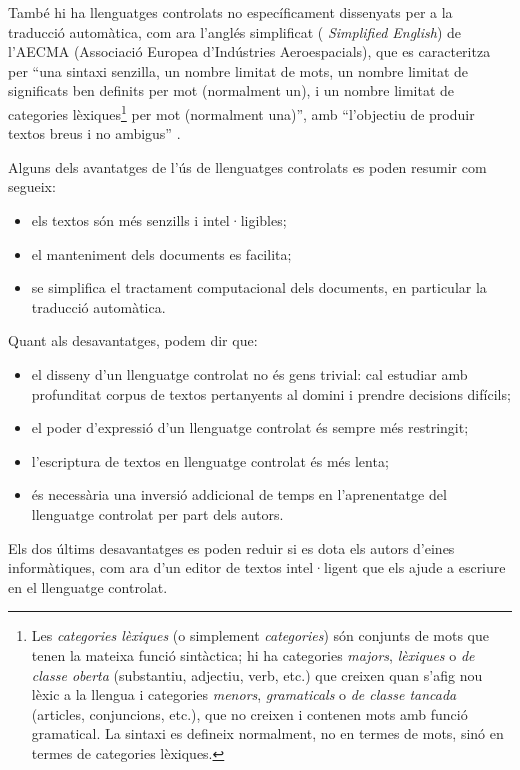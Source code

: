També hi ha llenguatges controlats no específicament dissenyats per a
la traducció automàtica, com ara l'anglés simplificat ({\em
  Simplified English}) de l'AECMA (Associació Europea d'Indústries
Aeroespacials), que es caracteritza per ``una sintaxi senzilla, un
nombre limitat de mots, un nombre limitat de significats ben definits
per mot (normalment un), i un nombre limitat de categories
lèxiques\footnote{Les \emph{categories lèxiques} (o simplement {\em
    categories}) són conjunts de mots que tenen la mateixa funció
  sintàctica; hi ha categories \emph{majors}, \emph{lèxiques} o
  \emph{de classe oberta} (substantiu, adjectiu, verb, etc.) que
  creixen quan s'afig nou lèxic a la llengua i categories
  \emph{menors}, {\em gramaticals} o \emph{de classe tancada}
  (articles, conjuncions, etc.), que no creixen i contenen mots amb
  funció gramatical. La sintaxi es defineix normalment, no en termes
  de mots, sinó en termes de categories lèxiques.}\label{pg:catgra}
per mot (normalment una)'', amb ``l'objectiu de produir textos breus i
no ambigus'' \citep{AECMA07u}.


Alguns dels avantatges de l'ús de llenguatges controlats \citep{schwitten07u} es poden
resumir com segueix:
\begin{itemize}
\item els textos són més senzills i intel·ligibles;
\item el manteniment dels documents es facilita;
\item se simplifica el tractament computacional dels documents,  en
particular la traducció automàtica.
\end{itemize} 
Quant als desavantatges, podem dir que:
\begin{itemize}
\item 
    el disseny d'un llenguatge controlat no és gens trivial: cal
    estudiar amb profunditat corpus de textos pertanyents al domini i
    prendre decisions difícils;
\item el poder d'expressió d'un llenguatge controlat és sempre
més restringit;
\item l'escriptura de textos en llenguatge controlat és més lenta;
\item és necessària una inversió addicional de temps en
l'aprenentatge del llenguatge controlat per part dels autors.  
\end{itemize}  
Els dos últims desavantatges es poden reduir si es dota els autors
d'eines informàtiques, com ara d'un
editor de textos intel·ligent que els ajude a escriure en el llenguatge
controlat.




